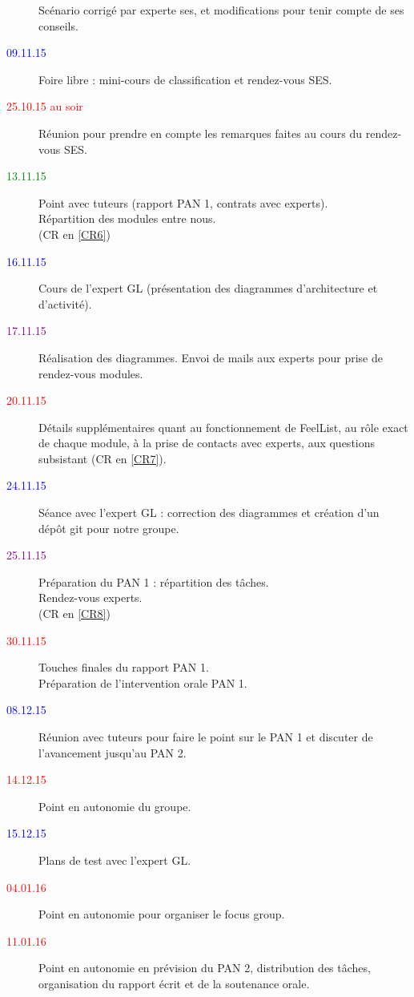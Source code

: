\begin{description}
			Scénario corrigé par experte ses, et modifications pour tenir compte de ses conseils.
		\item[\textcolor{Blue}{09.11.15}]
			Foire libre : mini-cours de classification et rendez-vous SES.
		\item[\textcolor{Red}{25.10.15 au soir}]
			Réunion pour prendre en compte les remarques faites au cours du rendez-vous SES.
		\item[\textcolor{Green}{13.11.15}]
			Point avec tuteurs (rapport PAN 1, contrats avec experts).\\
			Répartition des modules entre nous.\\
			(CR en \ref{CR6})
		\item[\textcolor{Blue}{16.11.15}]
			Cours de l'expert GL (présentation des diagrammes d'architecture et d'activité).
		\item[\textcolor{Purple}{17.11.15}]
			Réalisation des diagrammes.
			Envoi de mails aux experts pour prise de rendez-vous modules.
		\item[\textcolor{Red}{20.11.15}]
			Détails supplémentaires quant au fonctionnement de FeelList, au rôle exact de chaque module, à la prise de contacts avec experts, aux questions subsistant (CR en \ref{CR7}).
		\item[\textcolor{Blue}{24.11.15}]
			Séance avec l'expert GL : correction des diagrammes et création d'un dépôt git pour notre groupe.
		\item[\textcolor{Purple}{25.11.15}]
			Préparation du PAN 1 : répartition des tâches.\\
			Rendez-vous experts.\\
			(CR en \ref{CR8})
		\item[\textcolor{Red}{30.11.15}]
			Touches finales du rapport PAN 1.\\
			Préparation de l'intervention orale PAN 1.
		\item[\textcolor{Blue}{08.12.15}]
			Réunion avec tuteurs pour faire le point sur le PAN 1 et discuter de l'avancement jusqu'au PAN 2.
		\item[\textcolor{Red}{14.12.15}]
			Point en autonomie du groupe.
		\item[\textcolor{Blue}{15.12.15}]
			Plans de test avec l'expert GL.
		\item[\textcolor{Red}{04.01.16}]
			Point en autonomie pour organiser le focus group.
		\item[\textcolor{Red}{11.01.16}]
			Point en autonomie en prévision du PAN 2, distribution des tâches, organisation du rapport écrit et de la soutenance orale.
	\end{description}


